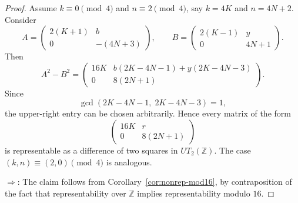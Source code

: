 \documentclass[10pt,a4paper]{amsart}
\begin{document}
\begin{proof}
Assume $k\equiv 0 \pmod 4$ and $n\equiv 2 \pmod 4$, say $k=4K$ and $n=4N+2$. Consider
$$A=\begin{pmatrix}2(K+1)&b\\0&-(4N+3)\end{pmatrix},\qquad
B=\begin{pmatrix}2(K-1)&y\\0&4N+1\end{pmatrix}.$$
Then
$$A^2-B^2=\begin{pmatrix}
16K &
b(2K-4N-1)+y(2K-4N-3)\\0 &8(2N+1)\end{pmatrix}.$$
Since
$$\gcd(2K-4N-1,\;2K-4N-3)=1,$$
the upper-right entry can be chosen arbitrarily. Hence every matrix of the form
$$\begin{pmatrix}
16K&r\\0&8(2N+1)
\end{pmatrix}$$
is representable as a difference of two squares in $UT_2(\mathbb Z)$. The case $(k,n)\equiv(2,0)\pmod 4$ is analogous.


$\boxed{\Rightarrow}$:
The claim follows from Corollary~\ref{cor:nonrep-mod16}, by contraposition of the fact that representability over $\mathbb Z$ implies representability modulo $16$.
\end{proof}
\end{document}

